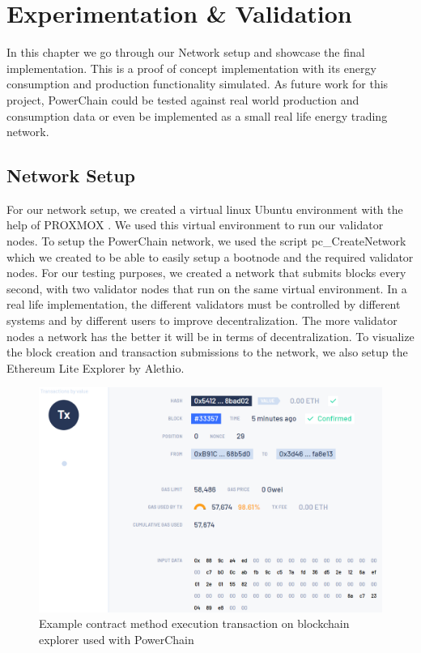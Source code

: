 \chapter{Experimentation \& Validation} \label{experimentationANDresults}
In this chapter we go through our Network setup and showcase the final implementation. This is a proof of concept implementation with its energy consumption and production functionality simulated.
As future work for this project, PowerChain could be tested against real world production and consumption data or even be implemented as a small real life energy trading network.

\section{Network Setup}
For our network setup, we created a virtual linux Ubuntu environment with the help of PROXMOX \cite{proxmox}.
We used this virtual environment to run our validator nodes. To setup the PowerChain network, we used the script pc\_CreateNetwork which we
created to be able to easily setup a bootnode and the required validator nodes. For our testing purposes, we created a network that submits blocks every second, with two validator nodes that
run on the same virtual environment. In a real life implementation, the different validators must be controlled by different systems and by different users to improve
decentralization. The more validator nodes a network has the better it will be in terms of decentralization. To visualize the block creation and transaction submissions 
to the network, we also setup the Ethereum Lite Explorer by Alethio.\cite{alethio} \\
\begin{figure}[h!]
    \centering
    \includegraphics[width=\linewidth,frame,scale=0.9]{Figures/explorer.png}
    \caption{Example contract method execution transaction on blockchain explorer used with PowerChain}
\end{figure}

